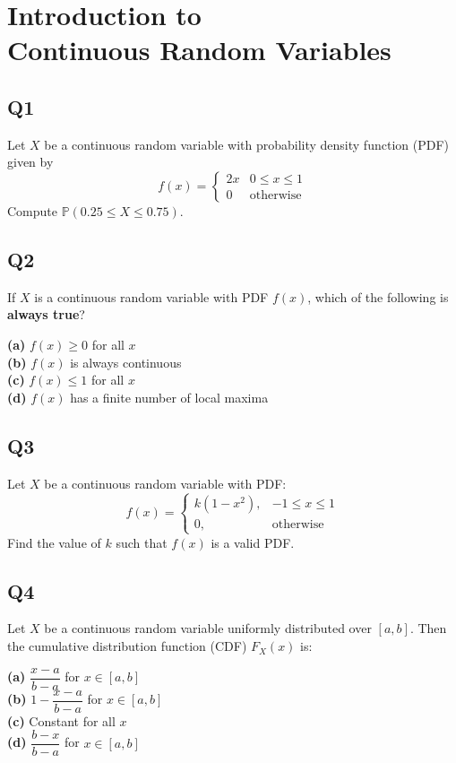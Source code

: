 \section[Introduction to Continuous Random Variables]
{Introduction to\\ Continuous Random Variables}

\subsection*{Q1}
Let $X$ be a continuous random variable with probability density function (PDF) given by
\[
f(x) = \begin{cases}
2x & 0 \leq x \leq 1 \\
0 & \text{otherwise}
\end{cases}
\]
Compute $\mathbb{P}(0.25 \leq X \leq 0.75)$.

\subsection*{Q2}
If $X$ is a continuous random variable with PDF $f(x)$, which of the following is \textbf{always true}?

\textbf{(a)} $f(x) \geq 0$ for all $x$ \\
\textbf{(b)} $f(x)$ is always continuous \\
\textbf{(c)} $f(x) \leq 1$ for all $x$ \\
\textbf{(d)} $f(x)$ has a finite number of local maxima

\subsection*{Q3}
Let $X$ be a continuous random variable with PDF:
\[
f(x) = \begin{cases}
k(1 - x^2), & -1 \leq x \leq 1 \\
0, & \text{otherwise}
\end{cases}
\]
Find the value of $k$ such that $f(x)$ is a valid PDF.

\subsection*{Q4}
Let $X$ be a continuous random variable uniformly distributed over $[a, b]$. Then the cumulative distribution function (CDF) $F_X(x)$ is:

\textbf{(a)} $\dfrac{x - a}{b - a}$ for $x \in [a, b]$ \\
\textbf{(b)} $1 - \dfrac{x - a}{b - a}$ for $x \in [a, b]$ \\
\textbf{(c)} Constant for all $x$ \\
\textbf{(d)} $\dfrac{b - x}{b - a}$ for $x \in [a, b]$

